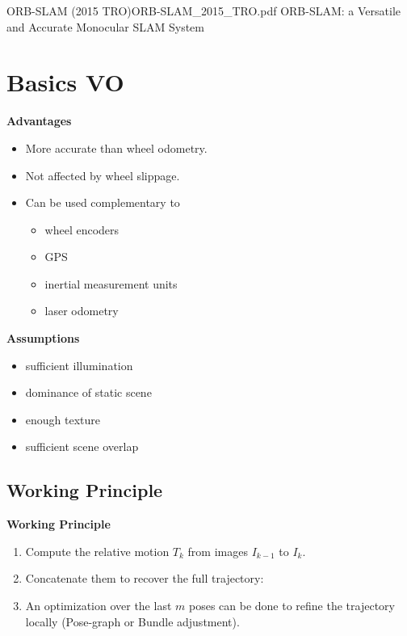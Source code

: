 \documentclass[10pt,a4paper]{scrartcl}
\begin{document}
\begin{multicols*}{2}
\begin{Paper}{ORB-SLAM (2015 TRO)}{ORB-SLAM_2015_TRO.pdf}
ORB-SLAM: a Versatile and Accurate Monocular SLAM System
\end{Paper}

\section{Basics VO}

\textbf{Advantages}
\begin{itemize}
\item More accurate than wheel odometry.
\item Not affected by wheel slippage.
\item Can be used complementary to
\begin{itemize}
\item wheel encoders
\item GPS
\item inertial measurement units
\item laser odometry
\end{itemize}
\end{itemize}

\textbf{Assumptions}
\begin{itemize}
\item sufficient illumination
\item dominance of static scene
\item enough texture
\item sufficient scene overlap
\end{itemize}

\subsection{Working Principle}


\textbf{Working Principle}

\begin{enumerate}
\item Compute the relative motion $T_k$ from images $I_{k-1}$ to $I_k$.
\item Concatenate them to recover the full trajectory:

\item An optimization over the last $m$ poses can be done to refine the trajectory locally (Pose-graph or Bundle adjustment).
\end{enumerate}


\end{multicols*}
\end{document}
